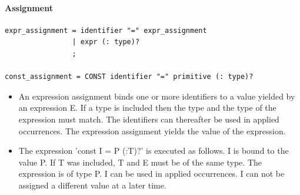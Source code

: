 \documentclass[paper=a4, fontsize=11pt]{article}
\numberwithin{equation}{section}		%
\numberwithin{figure}{section}			%
\numberwithin{table}{section}				%
\begin{document}
\paragraph{Assignment}
\begin{verbatim}
expr_assignment = identifier "=" expr_assignment
				| expr (: type)?
				;

const_assignment = CONST identifier "=" primitive (: type)?
\end{verbatim}

\begin{itemize}
\item An expression assignment binds one or more identifiers to a value yielded by an expression E. If a type is included then the type and the type of the expression must match. The identifiers can thereafter be used in applied occurrences. The expression assignment yields the value of the expression.
\item The expression 'const I = P (:T)?' is executed as follows. I is bound to the value P. If T was included, T and E must be of the same type. The expression is of type P. I can be used in applied occurrences. I can not be assigned a different value at a later time.
\end{itemize}
\end{document}
